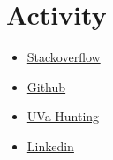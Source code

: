 \section{Activity}

\begin{itemize}
  \item \hyperlink{http://stackoverflow.com/users/2517488/touhid-alam}{Stackoverflow}
  \item \hyperlink{https://github.com/touhid91}{Github}
  \item \hyperlink{http://uhunt.felix-halim.net/id/779033}{UVa Hunting}
  \item \hyperlink{https://bd.linkedin.com/pub/touhid-alam/a7/397/760}{Linkedin}
\end{itemize}
